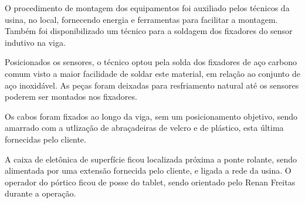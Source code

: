  O procedimento de montagem dos equipamentos foi auxiliado pelos técnicos da
 usina, no local, fornecendo energia e ferramentas para facilitar a montagem.
 Também foi disponibilizado um técnico para a soldagem dos fixadores do sensor
 indutivo na viga.
 
 Posicionados os sensores, o técnico optou pela solda dos fixadores de aço
 carbono comum visto a maior facilidade de soldar este material, em relação ao
 conjunto de aço inoxidável. As peças foram deixadas para resfriamento natural
 até os sensores poderem ser montados nos fixadores.
 
 Os cabos foram fixados ao longo da viga, sem um posicionamento objetivo, sendo
 amarrado com a utlização de abraçadeiras de velcro e de plástico, esta última
 fornecidas pelo cliente. 
 
 A caixa de eletônica de superfície ficou localizada próxima a ponte rolante,
 sendo alimentada por uma extensão fornecida pelo cliente, e ligada a rede da
 usina. O operador do pórtico ficou de posse do tablet, sendo orientado pelo
 Renan Freitas durante a operação.
